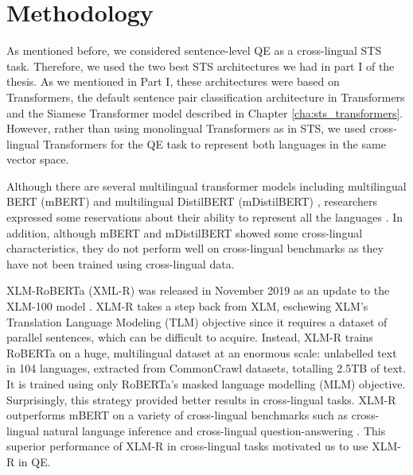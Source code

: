 \section{Methodology}
\label{sec:transquest_method}
As mentioned before, we considered sentence-level QE as a cross-lingual STS task. Therefore, we used the two best STS architectures we had in part I of the thesis. As we mentioned in Part I, these architectures were based on Transformers, the default sentence pair classification architecture in Transformers and the Siamese Transformer model described in Chapter \ref{cha:sts_transformers}. However, rather than using monolingual Transformers as in STS, we used cross-lingual Transformers for the QE task to represent both languages in the same vector space.

Although there are several multilingual transformer models including multilingual BERT (mBERT) \autocite{devlin-etal-2019-bert} and multilingual DistilBERT (mDistilBERT) \autocite{Sanh2019DistilBERTAD}, researchers expressed some reservations about their ability to represent all the languages \autocite{pires-etal-2019-multilingual}. In addition, although mBERT and mDistilBERT showed some cross-lingual characteristics, they do not perform well on cross-lingual benchmarks \autocite{karthikeyan2020cross} as they have not been trained using cross-lingual data. 

XLM-RoBERTa (XML-R) was released in November 2019 \autocite{conneau-etal-2020-unsupervised} as an update to the XLM-100 model \autocite{lample2019cross}. XLM-R takes a step back from XLM, eschewing XLM's Translation Language Modeling (TLM) objective since it requires a dataset of parallel sentences, which can be difficult to acquire. Instead, XLM-R trains RoBERTa\autocite{liu2019roberta} on a huge, multilingual dataset at an enormous scale: unlabelled text in 104 languages, extracted from CommonCrawl datasets, totalling 2.5TB of text. It is trained using only RoBERTa's \autocite{liu2019roberta} masked language modelling (MLM) objective. Surprisingly, this strategy provided better results in cross-lingual tasks. XLM-R outperforms mBERT on a variety of cross-lingual benchmarks such as cross-lingual natural language inference and cross-lingual question-answering \autocite{conneau-etal-2020-unsupervised}. This superior performance of XLM-R in cross-lingual tasks motivated us to use XLM-R in QE. 

